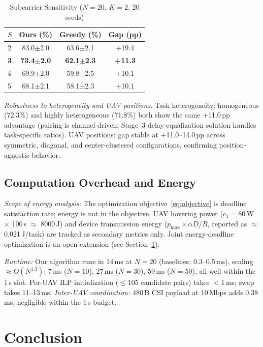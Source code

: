 \documentclass[journal]{IEEEtran}
\begin{document}
\begin{table}[t]
\centering
\caption{Subcarrier Sensitivity ($N=20$, $K=2$, 20 seeds)}
\label{tab:nsub}
\begin{tabular}{lccc}
\toprule
$S$ & Ours (\%) & Greedy (\%) & Gap (pp) \\
\midrule
2 & 83.0$\pm$2.0 & 63.6$\pm$2.1 & +19.4 \\
\textbf{3} & \textbf{73.4$\pm$2.0} & \textbf{62.1$\pm$2.3} & \textbf{+11.3} \\
4 & 69.9$\pm$2.0 & 59.8$\pm$2.5 & +10.1 \\
5 & 68.1$\pm$2.1 & 58.1$\pm$2.3 & +10.1 \\
\bottomrule
\end{tabular}
\end{table}

\emph{Robustness to heterogeneity and UAV positions.}
Task heterogeneity: homogeneous (72.3\%) and highly heterogeneous (71.8\%) both show the same +11.0\,pp advantage (pairing is channel-driven; Stage~3 delay-equalization solution handles task-specific ratios).
UAV positions: gap stable at +11.0--14.0\,pp across symmetric, diagonal, and center-clustered configurations, confirming position-agnostic behavior.

\subsection{Computation Overhead and Energy}

\emph{Scope of energy analysis:}
The optimization objective~\eqref{eq:objective} is deadline satisfaction rate; energy is not in the objective.
UAV hovering power ($c_1 = 80$\,W $\times$ 100\,s $\approx$ 8000\,J) and device transmission energy ($p_{\max} \times \alpha D / R$, reported as $\approx$0.021\,J/task) are tracked as secondary metrics only.
Joint energy-deadline optimization is an open extension (see Section~\ref{sec:conclusion}).

\emph{Runtime:} Our algorithm runs in 14\,ms at $N\!=\!20$ (baselines: 0.3--0.5\,ms), scaling $\approx O(N^{1.3})$: 7\,ms ($N\!=\!10$), 27\,ms ($N\!=\!30$), 59\,ms ($N\!=\!50$), all well within the 1\,s slot.
Per-UAV ILP initialization ($\leq$105 candidate pairs) takes $<$1\,ms; swap takes 11--13\,ms.
\emph{Inter-UAV coordination:} 480\,B CSI payload at 10\,Mbps adds 0.38\,ms, negligible within the 1\,s budget.

\section{Conclusion}
\label{sec:conclusion}
\end{document}
